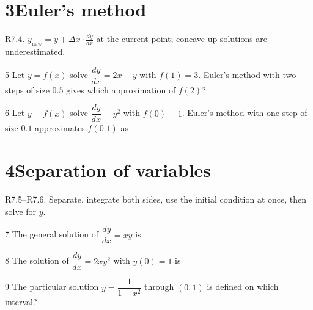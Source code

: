 \documentclass{apcalc}
\begin{document}
\section*{3\quad Euler's method}
\begin{setrule}R7.4. $y_{\text{new}}=y+\Delta x\cdot\frac{dy}{dx}$ at the current point; concave up solutions are underestimated.\end{setrule}
\begin{q}{5}
Let $y=f(x)$ solve $\dfrac{dy}{dx}=2x-y$ with $f(1)=3$. Euler's method with two steps of size $0.5$ gives which approximation of $f(2)$?
\end{q}
\begin{q}{6}
Let $y=f(x)$ solve $\dfrac{dy}{dx}=y^2$ with $f(0)=1$. Euler's method with one step of size $0.1$ approximates $f(0.1)$ as
\end{q}
\section*{4\quad Separation of variables}
\begin{setrule}R7.5–R7.6. Separate, integrate both sides, use the initial condition at once, then solve for $y$.\end{setrule}
\begin{q}{7}
The general solution of $\dfrac{dy}{dx}=xy$ is
\end{q}
\begin{q}{8}
The solution of $\dfrac{dy}{dx}=2xy^2$ with $y(0)=1$ is
\end{q}
\begin{q}{9}
The particular solution $y=\dfrac{1}{1-x^2}$ through $(0,1)$ is defined on which interval?
\end{q}
\end{document}

